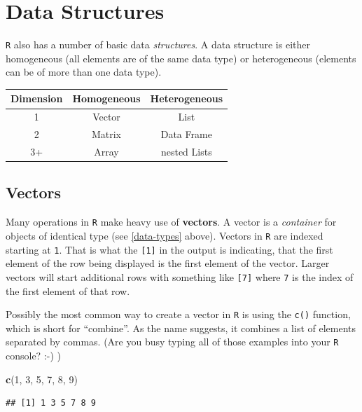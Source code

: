 \documentclass[]{book}
\newenvironment{Shaded}{\begin{snugshade}}{\end{snugshade}}
\newcommand{\KeywordTok}[1]{\textcolor[rgb]{0.13,0.29,0.53}{\textbf{#1}}}
\newcommand{\DecValTok}[1]{\textcolor[rgb]{0.00,0.00,0.81}{#1}}
\newcommand{\NormalTok}[1]{#1}
\begin{document}
\section{Data Structures}\label{data-structures}

\texttt{R} also has a number of basic data \emph{structures}. A data
structure is either homogeneous (all elements are of the same data type)
or heterogeneous (elements can be of more than one data type).

\begin{longtable}[]{@{}ccc@{}}
\toprule
Dimension & \textbf{Homogeneous} & \textbf{Heterogeneous}\tabularnewline
\midrule
\endhead
1 & Vector & List\tabularnewline
2 & Matrix & Data Frame\tabularnewline
3+ & Array & nested Lists\tabularnewline
\bottomrule
\end{longtable}

\subsection{Vectors}\label{vectors}

Many operations in \texttt{R} make heavy use of \textbf{vectors}. A
vector is a \emph{container} for objects of identical type (see
\ref{data-types} above). Vectors in \texttt{R} are indexed starting at
\texttt{1}. That is what the \texttt{{[}1{]}} in the output is
indicating, that the first element of the row being displayed is the
first element of the vector. Larger vectors will start additional rows
with something like \texttt{{[}7{]}} where \texttt{7} is the index of
the first element of that row.

Possibly the most common way to create a vector in \texttt{R} is using
the \texttt{c()} function, which is short for ``combine''. As the name
suggests, it combines a list of elements separated by commas. (Are you
busy typing all of those examples into your \texttt{R} console? :-) )

\begin{Shaded}
\begin{Highlighting}[]
\KeywordTok{c}\NormalTok{(}\DecValTok{1}\NormalTok{, }\DecValTok{3}\NormalTok{, }\DecValTok{5}\NormalTok{, }\DecValTok{7}\NormalTok{, }\DecValTok{8}\NormalTok{, }\DecValTok{9}\NormalTok{)}
\end{Highlighting}
\end{Shaded}

\begin{verbatim}
## [1] 1 3 5 7 8 9
\end{verbatim}
\end{document}
